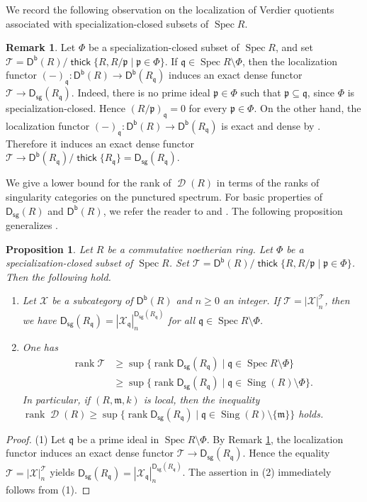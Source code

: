 \documentclass[10pt]{amsart}
\newtheorem{prop}[thm]{Proposition}
\theoremstyle{definition}
\newtheorem{rem}[thm]{Remark}
\theoremstyle{remark}
\numberwithin{equation}{thm}
\def\d{\operatorname{\mathscr{D}}}
\def\db{\operatorname{\mathsf{D^b}}}
\def\ds{\operatorname{\mathsf{D_{sg}}}}
\def\ge{\geqslant}
\def\m{\mathfrak{m}}
\def\p{\mathfrak{p}}
\def\q{\mathfrak{q}}
\def\rank{\operatorname{rank}}
\def\Sing{\operatorname{Sing}}
\def\Spec{\operatorname{Spec}}
\def\sup{\operatorname{sup}}
\def\T{\mathcal{T}}
\def\thick{\operatorname{\mathsf{thick}}}
\def\X{\mathcal{X}}
\begin{document}
We record the following observation on the localization of Verdier quotients associated with specialization-closed subsets of $\Spec R$.
\begin{rem}\label{rmk_vl}
Let $\Phi$ be a specialization-closed subset of $\Spec R$, and set $\T=\db(R)/\thick\{R,R/\p\mid \p\in\Phi\}$. 
If $\q\in\Spec R\setminus\Phi$, then the localization functor $(-)_{\q}:\db(R)\to\db(R_{\q})$ induces an exact dense functor $\T\to\ds(R_{\q})$. 
Indeed, there is no prime ideal $\p\in\Phi$ such that $\p\subseteq\q$, since $\Phi$ is specialization-closed.
Hence $(R/\p)_{\q}=0$ for every $\p\in\Phi$. 
On the other hand, the localization functor $(-)_{\q}\colon\db(R)\to\db(R_{\q})$ is exact and dense by \cite[Lemma 4.2(1)]{AT2015}.
Therefore it induces an exact dense functor $\T\to\db(R_{\q})/\thick\{R_{\q}\}=\ds(R_{\q})$.
\end{rem}
We give a lower bound for the rank of $\d(R)$ in terms of the ranks of singularity categories on the punctured spectrum.
For basic properties of $\ds(R)$ and $\db(R)$, we refer the reader to \cite[Lemma 2.4]{DT2015b} and \cite[Lemma 3.9]{MT}.
The following proposition generalizes \cite[Theorem 4.4]{MT}.
\begin{prop}\label{lower}
Let $R$ be a commutative noetherian ring.
Let $\Phi$ be a specialization-closed subset of $\Spec R$.
Set $\T=\db(R)/\thick\{R,R/\p\mid\p\in\Phi\}$.
Then the following hold.
\begin{enumerate}[\rm(1)]
\item
Let $\X$ be a subcategory of $\db(R)$ and $n\geq0$ an integer.
If $\T={|\X|}_{n}^{\T}$, then we have $\ds(R_{\q})={|\X_{\q}|}_{n}^{\ds(R_{\q})}$ for all $\q\in\Spec R\setminus\Phi$.
\item 
One has
\begin{align*}
\rank\T&\ge\sup\{\rank\ds(R_{\q})\mid\q\in\Spec R\setminus\Phi\} \\
&\ge\sup\{\rank\ds(R_{\q})\mid\q\in\Sing(R)\setminus\Phi\}.
\end{align*}
In particular, if $(R,\m,k)$ is local, then the inequality $\rank\d(R)\ge\sup\{\rank\ds(R_{\q})\mid\q\in\Sing(R)\setminus\{\m\}\}$ holds.
\end{enumerate}
\end{prop}
\begin{proof}
(1) Let $\q$ be a prime ideal in $\Spec R\setminus\Phi$.
By Remark \ref{rmk_vl}, the localization functor induces an exact dense functor $\T\to\ds(R_{\q})$.
Hence the equality $\T={|\X|}^{\T}_{n}$ yields $\ds(R_{\q})={|\X_{\q}|}^{\ds(R_{\q})}_{n}$.
The assertion in (2) immediately follows from (1).
\end{proof}
\end{document}
